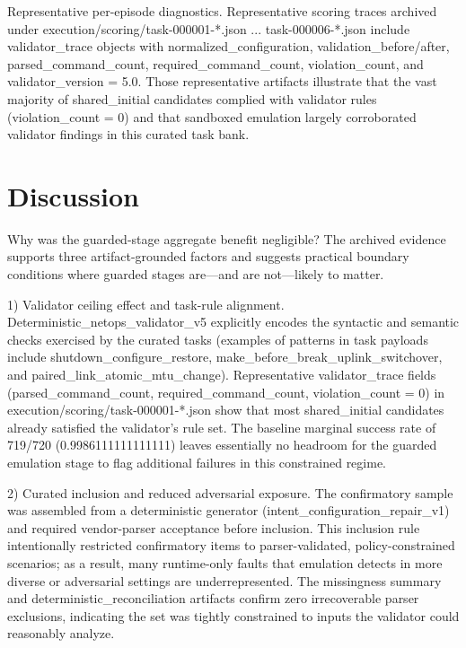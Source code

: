 \documentclass[conference]{IEEEtran}
\begin{document}
Representative per-episode diagnostics. Representative scoring traces archived under execution/scoring/task-000001-*.json ... task-000006-*.json include validator\_trace objects with normalized\_configuration, validation\_before/after, parsed\_command\_count, required\_command\_count, violation\_count, and validator\_version = 5.0. Those representative artifacts illustrate that the vast majority of shared\_initial candidates complied with validator rules (violation\_count = 0) and that sandboxed emulation largely corroborated validator findings in this curated task bank.

\section{Discussion}
Why was the guarded-stage aggregate benefit negligible? The archived evidence supports three artifact-grounded factors and suggests practical boundary conditions where guarded stages are---and are not---likely to matter.

1) Validator ceiling effect and task-rule alignment. Deterministic\_netops\_validator\_v5 explicitly encodes the syntactic and semantic checks exercised by the curated tasks (examples of patterns in task payloads include shutdown\_configure\_restore, make\_before\_break\_uplink\_switchover, and paired\_link\_atomic\_mtu\_change). Representative validator\_trace fields (parsed\_command\_count, required\_command\_count, violation\_count = 0) in execution/scoring/task-000001-*.json show that most shared\_initial candidates already satisfied the validator's rule set. The baseline marginal success rate of 719/720 (0.9986111111111111) leaves essentially no headroom for the guarded emulation stage to flag additional failures in this constrained regime.

2) Curated inclusion and reduced adversarial exposure. The confirmatory sample was assembled from a deterministic generator (intent\_configuration\_repair\_v1) and required vendor-parser acceptance before inclusion. This inclusion rule intentionally restricted confirmatory items to parser-validated, policy-constrained scenarios; as a result, many runtime-only faults that emulation detects in more diverse or adversarial settings are underrepresented. The missingness summary and deterministic\_reconciliation artifacts confirm zero irrecoverable parser exclusions, indicating the set was tightly constrained to inputs the validator could reasonably analyze.
\end{document}
